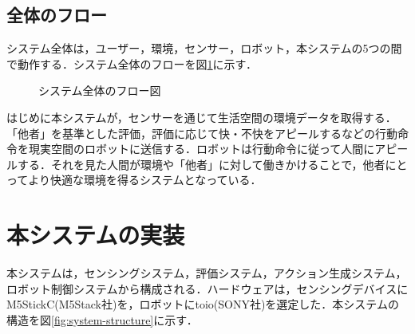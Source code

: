 \documentclass[paper=a4paper,jafontsize=9pt,head_space=15mm,gutter=20mm,
twocolumn,number_of_lines=49, line_length=26zw]{myuarticle}
\begin{document}
\subsection{全体のフロー}
システム全体は，ユーザー，環境，センサー，ロボット，本システムの5つの間で動作する．システム全体のフローを図\ref{fig:system-flow}に示す．

\fboxsep=0pt            %
\fboxrule=1pt            %
\begin{figure}[h]
  \centering
  \caption{システム全体のフロー図}
  \label{fig:system-flow}
\end{figure}

はじめに本システムが，センサーを通じて生活空間の環境データを取得する．「他者」を基準とした評価，評価に応じて快・不快をアピールするなどの行動命令を現実空間のロボットに送信する．ロボットは行動命令に従って人間にアピールする．それを見た人間が環境や「他者」に対して働きかけることで，他者にとってより快適な環境を得るシステムとなっている．

\section{本システムの実装}
本システムは，センシングシステム，評価システム，アクション生成システム，ロボット制御システムから構成される．ハードウェアは，センシングデバイスにM5StickC(M5Stack社)を，ロボットにtoio(SONY社)を選定した．本システムの構造を図\ref{fig:system-structure}に示す．
\end{document}
